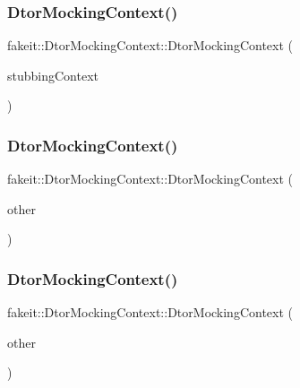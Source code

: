 \subsubsection{\texorpdfstring{DtorMockingContext()}{DtorMockingContext()}\hspace{0.1cm}{\footnotesize\ttfamily [10/27]}}
{\footnotesize\ttfamily fakeit\+::\+Dtor\+Mocking\+Context\+::\+Dtor\+Mocking\+Context (\begin{DoxyParamCaption}\item[{\mbox{\hyperlink{classfakeit_1_1MethodMockingContext}{Method\+Mocking\+Context}}$<$ void $>$\+::Context $\ast$}]{stubbing\+Context }\end{DoxyParamCaption})\hspace{0.3cm}{\ttfamily [inline]}}

\mbox{\label{classfakeit_1_1DtorMockingContext_a03939798c9836d082d94fe4e84d3dcd3}} 
\subsubsection{\texorpdfstring{DtorMockingContext()}{DtorMockingContext()}\hspace{0.1cm}{\footnotesize\ttfamily [11/27]}}
{\footnotesize\ttfamily fakeit\+::\+Dtor\+Mocking\+Context\+::\+Dtor\+Mocking\+Context (\begin{DoxyParamCaption}\item[{\mbox{\hyperlink{classfakeit_1_1DtorMockingContext}{Dtor\+Mocking\+Context}} \&}]{other }\end{DoxyParamCaption})\hspace{0.3cm}{\ttfamily [inline]}}

\mbox{\label{classfakeit_1_1DtorMockingContext_a0cf507524171b8ab2884f269a8a62a60}} 
\subsubsection{\texorpdfstring{DtorMockingContext()}{DtorMockingContext()}\hspace{0.1cm}{\footnotesize\ttfamily [12/27]}}
{\footnotesize\ttfamily fakeit\+::\+Dtor\+Mocking\+Context\+::\+Dtor\+Mocking\+Context (\begin{DoxyParamCaption}\item[{\mbox{\hyperlink{classfakeit_1_1DtorMockingContext}{Dtor\+Mocking\+Context}} \&\&}]{other }\end{DoxyParamCaption})\hspace{0.3cm}{\ttfamily [inline]}}

